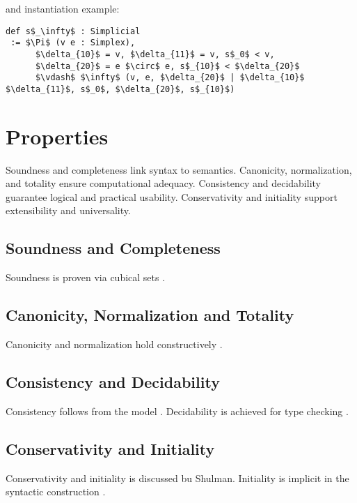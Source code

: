 \documentclass{article}
\begin{document}
and instantiation example:

\begin{lstlisting}[mathescape=true]
def s$_\infty$ : Simplicial
 := $\Pi$ (v e : Simplex),
      $\delta_{10}$ = v, $\delta_{11}$ = v, s$_0$ < v,
      $\delta_{20}$ = e $\circ$ e, s$_{10}$ < $\delta_{20}$
      $\vdash$ $\infty$ (v, e, $\delta_{20}$ | $\delta_{10}$ $\delta_{11}$, s$_0$, $\delta_{20}$, s$_{10}$)
\end{lstlisting}

\newpage
\section{Properties}

Soundness and completeness link syntax to semantics.
Canonicity, normalization, and totality ensure computational adequacy.
Consistency and decidability guarantee logical and practical usability.
Conservativity and initiality support extensibility and universality.

\subsection{Soundness and Completeness}

Soundness is proven via cubical sets \cite{CCHM, Awodey12, Coquand18}.

\subsection{Canonicity, Normalization and Totality}

Canonicity and normalization hold constructively \cite{Huber17, Streicher91}.

\subsection{Consistency and Decidability}

Consistency follows from the model \cite{Bezem14}.
Decidability is achieved for type checking \cite{Coquand18}.

\subsection{Conservativity and Initiality}

Conservativity and initiality is discussed bu Shulman\cite{Hofmann97, Shulman15}.
Initiality is implicit in the syntactic construction \cite{Awodey12}.
\end{document}
